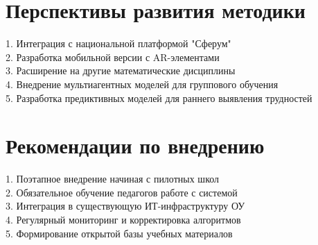 \documentclass[a4paper,14pt]{extreport}
\begin{document}
\section*{Перспективы развития методики}
1. Интеграция с национальной платформой "Сферум"\\
2. Разработка мобильной версии с AR-элементами\\
3. Расширение на другие математические дисциплины\\
4. Внедрение мультиагентных моделей для группового обучения\\
5. Разработка предиктивных моделей для раннего выявления трудностей

\section*{Рекомендации по внедрению}
1. Поэтапное внедрение начиная с пилотных школ\\
2. Обязательное обучение педагогов работе с системой\\
3. Интеграция в существующую ИТ-инфраструктуру ОУ\\
4. Регулярный мониторинг и корректировка алгоритмов\\
5. Формирование открытой базы учебных материалов
\end{document}
